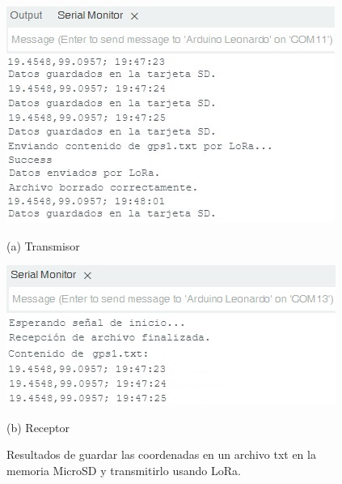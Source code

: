 \begin{itemize}
\begin{figure}[H]
	\centering
	\begin{minipage}[b]{0.65\textwidth}
		\centering
		\includegraphics[width=\textwidth]{imagenes/data9}
		\caption*{(a) Transmisor}
	\end{minipage}
	\quad
	\begin{minipage}[b]{0.65\textwidth}
		\centering
		\includegraphics[width=\textwidth]{imagenes/data10}
		\caption*{(b) Receptor}
	\end{minipage}
	\caption{Resultados de guardar las coordenadas en un archivo txt en la memoria MicroSD y transmitirlo usando LoRa.}
	\label{fig:transmission_results}
\end{figure}
	

\end{itemize}
